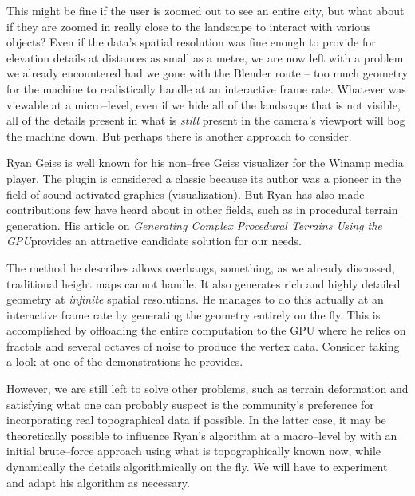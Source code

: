 This might be fine if the user is zoomed out to see an entire city, but what about if they are zoomed in really close to the landscape to interact with various objects? Even if the data's spatial resolution was fine enough to provide for elevation details at distances as small as a metre, we are now left with a problem we already encountered had we gone with the Blender route -- too much geometry for the machine to realistically handle at an interactive frame rate. Whatever was viewable at a micro--level, even if we hide all of the landscape that is not visible, all of the details present in what is {\it still} present in the camera's viewport will bog the machine down. But perhaps there is another approach to consider.

Ryan Geiss is well known for his non--free Geiss visualizer for the Winamp media player. The plugin is considered a classic because its author was a pioneer in the field of sound activated graphics (visualization). But Ryan has also made contributions few have heard about in other fields, such as in procedural terrain generation. His article on {\it Generating Complex Procedural Terrains Using the GPU} provides an attractive candidate solution for our needs. 

The method he describes allows overhangs, something, as we already discussed, traditional height maps cannot handle. It also generates rich and highly detailed geometry at {\it infinite} spatial resolutions. He manages to do this actually at an interactive frame rate by generating the geometry entirely on the fly. This is accomplished by offloading the entire computation to the GPU where he relies on fractals and several octaves of noise to produce the vertex data. Consider taking a look at one of the demonstrations he provides.

However, we are still left to solve other problems, such as terrain deformation and satisfying what one can probably suspect is the community's preference for incorporating real topographical data if possible. In the latter case, it may be theoretically possible to influence Ryan's algorithm at a macro--level by  with an initial brute--force approach using what is topographically known now, while dynamically  the details algorithmically on the fly. We will have to experiment and adapt his algorithm as necessary.


